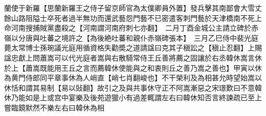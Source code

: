 蘭使于新羅【思蘭新羅王之侍子留京師官為太僕卿員外置】發兵擊其南鄙會大雪丈餘山路阻隘士卒死者過半無功而還武藝怨門藝不已密遣客刺門藝於天津橋南不死上命河南搜捕賊黨盡殺之【河南謂河南府刺七亦翻】　二月丁酉金城公主請立碑於赤嶺以分唐與吐蕃之境許之【為後絶吐蕃和親仆赤嶺碑張本】　三月乙巳侍中裴光庭薨太常博士孫琬議光庭用循資格失勸奬之道請諡曰克其子稹訟之【稹止忍翻】上賜諡忠獻上問蕭嵩可以代光庭者嵩與右散騎常侍王丘善將薦之固讓於右丞韓休嵩言休於上【蕭嵩既能用王丘之言而薦韓休使能與之和衷則丘之善乃嵩之善也】甲寅以休為黄門侍郎同平章事休為人峭直【峭七肖翻峻也】不干榮利及為相甚允時望始嵩以休恬和謂其易制【易以䜴翻】故引之及與共事休守正不阿嵩漸惡之宋璟歎曰不意韓休乃能如是上或宫中宴樂及後苑遊獵小有過差輒謂左右曰韓休知否言終諫疏已至上嘗臨鏡默然不樂左右曰韓休為相